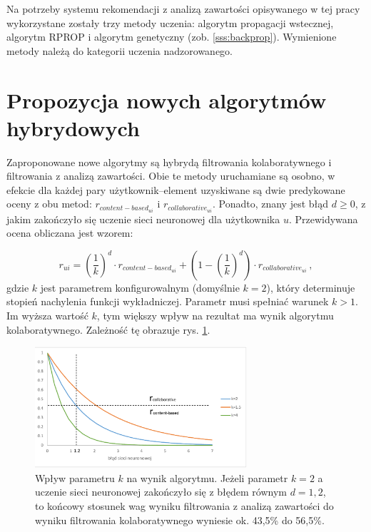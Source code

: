 \documentclass[twoside]{iisthesis}
\begin{document}
		 Na potrzeby systemu rekomendacji z analizą zawartości opisywanego w tej pracy wykorzystane zostały trzy metody uczenia: algorytm propagacji wstecznej, algorytm RPROP i algorytm genetyczny (zob. \ref{sss:backprop}). Wymienione metody należą do kategorii uczenia nadzorowanego. 

	 \section{Propozycja nowych algorytmów hybrydowych}
		 
		 Zaproponowane nowe algorytmy są hybrydą filtrowania kolaboratywnego i filtrowania z analizą zawartości. Obie te metody uruchamiane są osobno, w efekcie dla każdej pary użytkownik--element uzyskiwane są dwie  predykowane oceny z obu metod:  $r_{content-based_{ui}}$ i $r_{collaborative_{ui}}$. Ponadto, znany jest błąd $d \geq 0$, z jakim zakończyło się uczenie sieci neuronowej dla użytkownika $u$. Przewidywana ocena obliczana jest wzorem:
		 
		 \begin{equation}
		 	\label{eq:hybrid}		 	
		 	 r_{ui} = (\frac{1}{k})^d \cdot r_{content-based_{ui}} + (1-(\frac{1}{k})^d) \cdot r_{collaborative_{ui}}
		 	\,,
		 \end{equation}		 
		 gdzie $k$ jest parametrem konfigurowalnym (domyślnie $k = 2$), który determinuje stopień nachylenia funkcji wykładniczej. Parametr musi spełniać warunek $k>1$. Im wyższa wartość $k$, tym większy wpływ na rezultat ma wynik algorytmu kolaboratywnego. Zależność tę obrazuje rys. \ref{fig:hybridfunction}.
		 
		 \begin{figure}[!ht] 
		 	\centering
		 	\includegraphics[width=0.7\textwidth]{hybridfunction}
		 	\caption{Wpływ parametru $k$ na wynik algorytmu. Jeżeli parametr $k=2$ a uczenie sieci neuronowej zakończyło się z błędem równym $d=1,2$, to końcowy stosunek wag wyniku filtrowania z analizą zawartości do wyniku filtrowania kolaboratywnego wyniesie ok. 43,5\% do 56,5\%.}
		 	\label{fig:hybridfunction}
		 \end{figure}
		 
\end{document}
